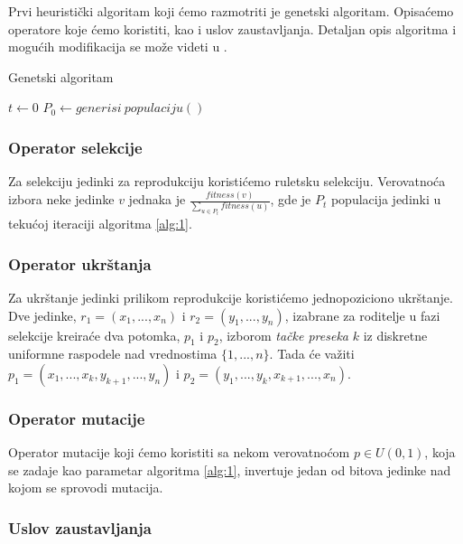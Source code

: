 \documentclass[12pt, a4paper]{article}
\theoremstyle{definition}
\begin{document}
Prvi heuristički algoritam koji ćemo razmotriti je genetski algoritam. Opisaćemo operatore koje ćemo koristiti, kao i uslov zaustavljanja. Detaljan opis algoritma i mogućih modifikacija se može videti u \cite{3}.

\begin{algorithm}
\caption{Genetski algoritam}
\label{alg:1}
$t \gets 0$\;
$P_0 \gets generisi\ populaciju()$\;
\end{algorithm}

\subsubsection{Operator selekcije}

Za selekciju jedinki za reprodukciju koristićemo ruletsku selekciju. Verovatnoća izbora neke jedinke $v$ jednaka je $\frac{fitness(v)}{\sum_{u \in P_t} fitness(u)}$, gde je $P_t$ populacija jedinki u tekućoj iteraciji algoritma \ref{alg:1}.

\subsubsection{Operator ukrštanja}

Za ukrštanje jedinki prilikom reprodukcije koristićemo jednopoziciono ukrštanje. Dve jedinke, $r_1 = (x_1, ..., x_n)$ i $r_2 = (y_1, ..., y_n)$, izabrane za roditelje u fazi selekcije kreiraće dva potomka, $p_1$ i $p_2$, izborom \emph{tačke preseka} $k$ iz diskretne uniformne raspodele nad vrednostima $\{1, ..., n\}$. Tada će važiti $p_1 = (x_1, ..., x_k, y_{k + 1}, ..., y_n)$ i $p_2 = (y_1, ..., y_k, x_{k + 1}, ..., x_n)$.

\subsubsection{Operator mutacije}

Operator mutacije koji ćemo koristiti sa nekom verovatnoćom $p \in U(0, 1)$, koja se zadaje kao parametar algoritma \ref{alg:1}, invertuje jedan od bitova jedinke nad kojom se sprovodi mutacija.

\subsubsection{Uslov zaustavljanja}
\end{document}
